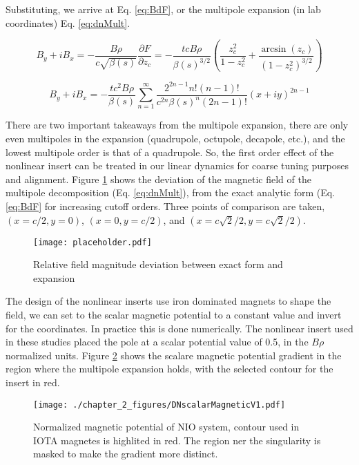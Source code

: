 Substituting, we arrive at Eq. \ref{eq:BdF}, or the multipole expansion (in lab coordinates) Eq. \ref{eq:dnMult}.

\begin{equation} \label{eq:BdF}
	B_y + i B_x  = -\frac{B\rho}{c\sqrt{\beta(s)}}\frac{\partial F}{\partial z_c} = - \frac{t c B\rho}{\beta(s)^{3/2}} \left( \frac{z_c^2}{1 - z_c^2} + \frac{\arcsin{(z_c)}}{\left(1-z_c^2\right)^{3/2}}\right)
\end{equation}

\begin{equation} \label{eq:dnMult}
	B_y + i B_x = - \frac{t c^2 B\rho}{\beta(s)} \sum_{n=1}^{\infty} \frac{2^{2n-1}n!(n-1)!}{c^{2n}\beta(s)^n(2n-1)!} (x + i y)^{2n -1}
\end{equation}

There are two important takeaways from the multipole expansion, there are only even multipoles in the expansion (quadrupole, octupole, decapole, etc.), and the lowest multipole order is that of a quadrupole. So, the first order effect of the nonlinear insert can be treated in our linear dynamics for coarse tuning purposes and alignment. Figure \ref{fig:dnMultRatio} shows the deviation of the magnetic field of the multipole decomposition (Eq. \ref{eq:dnMult}), from the exact analytic form (Eq. \ref{eq:BdF} for increasing cutoff orders. Three points of comparison are taken, $(x=c/2,y=0)$, $(x=0,y=c/2)$, and $(x=c\sqrt{2}/2,y=c\sqrt{2}/2)$. 

\begin{figure}
	\centering
	\texttt{[image: placeholder.pdf]}
	\caption{Relative field magnitude deviation between exact form and expansion}
	\label{fig:dnMultRatio}
\end{figure}

The design of the nonlinear inserts use iron dominated magnets to shape the field, we can set to the scalar magnetic potential to a constant value and invert for the coordinates. In practice this is done numerically. The nonlinear insert used in these studies placed the pole at a scalar potential value of 0.5, in the $B\rho$ normalized units. Figure \ref{fig:dnMagPtCurve} shows the scalare magnetic potential gradient in the region where the multipole expansion holds, with the selected contour for the insert in red.

\begin{figure}
	\centering
	\texttt{[image: ./chapter\_2\_figures/DNscalarMagneticV1.pdf]}
	\caption{Normalized magnetic potential of NIO system, contour used in IOTA magnetes is highlited in red. The region ner the singularity is masked to make the gradient more distinct.}
	\label{fig:dnMagPtCurve}
\end{figure}

